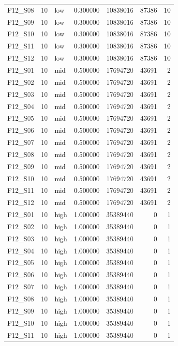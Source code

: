 \begin{longtable}{lllr r r r}
F12\_S08 & 10 & low & 0.300000 & 10838016 & 87386 & 10 \\
F12\_S09 & 10 & low & 0.300000 & 10838016 & 87386 & 10 \\
F12\_S10 & 10 & low & 0.300000 & 10838016 & 87386 & 10 \\
F12\_S11 & 10 & low & 0.300000 & 10838016 & 87386 & 10 \\
F12\_S12 & 10 & low & 0.300000 & 10838016 & 87386 & 10 \\
F12\_S01 & 10 & mid & 0.500000 & 17694720 & 43691 & 2 \\
F12\_S02 & 10 & mid & 0.500000 & 17694720 & 43691 & 2 \\
F12\_S03 & 10 & mid & 0.500000 & 17694720 & 43691 & 2 \\
F12\_S04 & 10 & mid & 0.500000 & 17694720 & 43691 & 2 \\
F12\_S05 & 10 & mid & 0.500000 & 17694720 & 43691 & 2 \\
F12\_S06 & 10 & mid & 0.500000 & 17694720 & 43691 & 2 \\
F12\_S07 & 10 & mid & 0.500000 & 17694720 & 43691 & 2 \\
F12\_S08 & 10 & mid & 0.500000 & 17694720 & 43691 & 2 \\
F12\_S09 & 10 & mid & 0.500000 & 17694720 & 43691 & 2 \\
F12\_S10 & 10 & mid & 0.500000 & 17694720 & 43691 & 2 \\
F12\_S11 & 10 & mid & 0.500000 & 17694720 & 43691 & 2 \\
F12\_S12 & 10 & mid & 0.500000 & 17694720 & 43691 & 2 \\
F12\_S01 & 10 & high & 1.000000 & 35389440 & 0 & 1 \\
F12\_S02 & 10 & high & 1.000000 & 35389440 & 0 & 1 \\
F12\_S03 & 10 & high & 1.000000 & 35389440 & 0 & 1 \\
F12\_S04 & 10 & high & 1.000000 & 35389440 & 0 & 1 \\
F12\_S05 & 10 & high & 1.000000 & 35389440 & 0 & 1 \\
F12\_S06 & 10 & high & 1.000000 & 35389440 & 0 & 1 \\
F12\_S07 & 10 & high & 1.000000 & 35389440 & 0 & 1 \\
F12\_S08 & 10 & high & 1.000000 & 35389440 & 0 & 1 \\
F12\_S09 & 10 & high & 1.000000 & 35389440 & 0 & 1 \\
F12\_S10 & 10 & high & 1.000000 & 35389440 & 0 & 1 \\
F12\_S11 & 10 & high & 1.000000 & 35389440 & 0 & 1 \\

\end{longtable}
